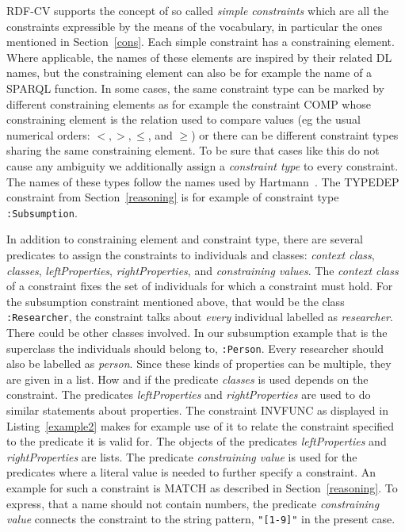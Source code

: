 RDF-CV supports the concept of so called \emph{simple constraints} which are all the constraints expressible by the means of the vocabulary, in particular 
the ones mentioned in Section~\ref{cons}. Each simple constraint has a constraining element. Where applicable, the names of these elements are inspired by their related 
DL names, but the constraining element can also be for example the name of a SPARQL function. In some cases, the same constraint type 
can be marked by different constraining elements as for example the constraint COMP whose constraining element is the relation 
used to compare values 
(eg the usual numerical orders: $<,>,\leq$, and $\geq$) or there can be different constraint types sharing the same constraining element.
To be sure that cases like this do not cause any ambiguity we additionally assign a \emph{constraint type} to every constraint. 
The names of these types follow the names used by Hartmann~\cite[appendix]{hartmann2016}. 
The TYPEDEP constraint from Section~\ref{reasoning} is for example of constraint type \texttt{:Subsumption}.

In addition to constraining element and constraint type, there are several predicates to assign the constraints to individuals and classes: \emph{context class}, 
\emph{classes}, 
\emph{leftProperties}, 
\emph{rightProperties}, and \emph{constraining values}.
The \emph{context class} of a constraint fixes the set of individuals for which a constraint must hold. For the subsumption constraint mentioned above, that would be 
the class \texttt{:Researcher}, the constraint talks about \emph{every} individual labelled as \emph{researcher}. 
There could be other classes involved. In our subsumption example that is the superclass the  
individuals should belong to, \texttt{:Person}. Every researcher should also be labelled as \emph{person}. %
Since these kinds of properties can be multiple, 
they are given in a
list. How and if the predicate  \emph{classes} is used depends on the constraint.
The predicates \emph{leftProperties} and \emph{rightProperties} are used to do similar statements about properties. The constraint INVFUNC as displayed in 
Listing~\ref{example2} makes for example use of it to 
relate the constraint specified to the predicate it is valid for. The objects of the predicates \emph{leftProperties} and \emph{rightProperties} are lists. The predicate 
\emph{constraining value}
 is used for the predicates where a literal value is needed to further specify a constraint. An example for such a constraint is MATCH as described in Section~\ref{reasoning}. To 
 express, that a name should not contain numbers, the predicate \emph{constraining value} connects the constraint to the string pattern,
 \texttt{"[1-9]"} in the present case. 



